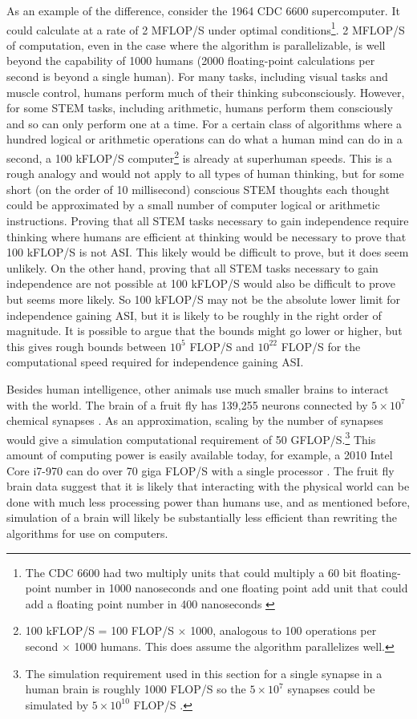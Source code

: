 \documentclass[letterpaper,twocolumn]{article}
\begin{document}
As an example of the difference, consider the 1964 CDC 6600
supercomputer. It could calculate at a rate of 2 MFLOP/S under optimal
conditions\footnote{The CDC 6600 had two multiply units that could
multiply a 60 bit floating-point number in 1000 nanoseconds and one
floating point add unit that could add a floating point number in 400
nanoseconds \citep[pp. 77 and 88]{cdc6600thornton}}. 2 MFLOP/S of
computation, even in the case where the algorithm is parallelizable,
is well beyond the capability of 1000 humans (2000 floating-point
calculations per second is beyond a single human). For many tasks,
including visual tasks and muscle control, humans perform much of
their thinking subconsciously. However, for some STEM tasks, including
arithmetic, humans perform them consciously and so can only perform
one at a time. For a certain class of algorithms where a hundred
logical or arithmetic operations can do what a human mind can do in a
second, a 100 kFLOP/S computer\footnote{100 kFLOP/S = 100 FLOP/S
$\times$ 1000, analogous to 100 operations per second $\times$ 1000
humans. This does assume the algorithm parallelizes well.} is already
at superhuman speeds. This is a rough analogy and would not apply to
all types of human thinking, but for some short (on the order of 10
millisecond) conscious STEM thoughts each thought could be
approximated by a small number of computer logical or arithmetic
instructions.  Proving that all STEM tasks necessary to gain
independence require thinking where humans are efficient at thinking
would be necessary to prove that 100 kFLOP/S is not ASI. This likely
would be difficult to prove, but it does seem unlikely. On the other
hand, proving that all STEM tasks necessary to gain independence are
not possible at 100 kFLOP/S would also be difficult to prove but seems
more likely. So 100 kFLOP/S may not be the absolute lower limit for
independence gaining ASI, but it is likely to be roughly in the right
order of magnitude.  It is possible to argue that the bounds might go
lower or higher, but this gives rough bounds between $10^5$ FLOP/S and
$10^{22}$ FLOP/S for the computational speed required for independence
gaining ASI.

Besides human intelligence, other animals use much smaller brains to
interact with the world.  The brain of a fruit fly has 139,255 neurons
connected by $5 \times 10^7$ chemical synapses
\citep{Dorkenwald2024}. As an approximation, scaling by the number of
synapses would give a simulation computational requirement of 50
GFLOP/S.\footnote{The simulation requirement used in this section for
a single synapse in a human brain is roughly 1000 FLOP/S so the $5
\times 10^7$ synapses could be simulated by $5 \times 10^{10}$ FLOP/S
\citep{hpcbrainscience}.} This amount of computing power is easily
available today, for example, a 2010 Intel Core i7-970 can do over 70
giga FLOP/S with a single processor \citep{intelflops}. The fruit fly
brain data suggest that it is likely that interacting with the
physical world can be done with much less processing power than humans
use, and as mentioned before, simulation of a brain will likely be
substantially less efficient than rewriting the algorithms for use on
computers.
\end{document}
